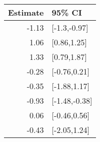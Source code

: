 \begin{tabular}{rl}
  \hline
Estimate & 95\% CI \\ 
  \hline
-1.13 & [-1.3,-0.97] \\ 
  1.06 & [0.86,1.25] \\ 
  1.33 & [0.79,1.87] \\ 
  -0.28 & [-0.76,0.21] \\ 
  -0.35 & [-1.88,1.17] \\ 
  -0.93 & [-1.48,-0.38] \\ 
  0.06 & [-0.46,0.56] \\ 
  -0.43 & [-2.05,1.24] \\ 
   \hline
\end{tabular}

